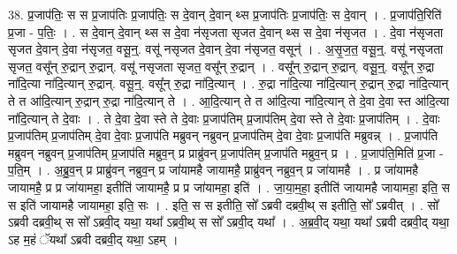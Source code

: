 \documentclass[17pt]{extarticle}
\begin{document}
38. प्र॒जाप॑तिः॒ स स प्र॒जाप॑तिः प्र॒जाप॑तिः॒ स दे॒वान् दे॒वान् थ्स प्र॒जाप॑तिः प्र॒जाप॑तिः॒ स दे॒वान् । . प्र॒जाप॑ति॒रिति॑ प्र॒जा - प॒तिः॒ । . स दे॒वान् दे॒वान् थ्स स दे॒वा न॑सृजता सृजत दे॒वान् थ्स स दे॒वा न॑सृजत । . दे॒वा न॑सृजता सृजत दे॒वान् दे॒वा न॑सृजत॒ वसू॒न्॒. वसू॑ नसृजत दे॒वान् दे॒वा न॑सृजत॒ वसून्॑ । . अ॒सृ॒ज॒त॒ वसू॒न्॒. वसू॑ नसृजता सृजत॒ वसू᳚न् रु॒द्रान् रु॒द्रान्. वसू॑ नसृजता सृजत॒ वसू᳚न् रु॒द्रान् । . वसू᳚न् रु॒द्रान् रु॒द्रान्. वसू॒न्॒. वसू᳚न् रु॒द्रा ना॑दि॒त्या ना॑दि॒त्यान् रु॒द्रान्. वसू॒न्॒. वसू᳚न् रु॒द्रा ना॑दि॒त्यान् । . रु॒द्रा ना॑दि॒त्या ना॑दि॒त्यान् रु॒द्रान् रु॒द्रा ना॑दि॒त्यान् ते त आ॑दि॒त्यान् रु॒द्रान् रु॒द्रा ना॑दि॒त्यान् ते । . आ॒दि॒त्यान् ते त आ॑दि॒त्या ना॑दि॒त्यान् ते दे॒वा दे॒वा स्त आ॑दि॒त्या ना॑दि॒त्यान् ते दे॒वाः । . ते दे॒वा दे॒वा स्ते ते दे॒वाः प्र॒जाप॑तिम् प्र॒जाप॑तिम् दे॒वा स्ते ते दे॒वाः प्र॒जाप॑तिम् । . दे॒वाः प्र॒जाप॑तिम् प्र॒जाप॑तिम् दे॒वा दे॒वाः प्र॒जाप॑ति मब्रुवन् नब्रुवन् प्र॒जाप॑तिम् दे॒वा दे॒वाः प्र॒जाप॑ति मब्रुवन्न् । . प्र॒जाप॑ति मब्रुवन् नब्रुवन् प्र॒जाप॑तिम् प्र॒जाप॑ति मब्रुव॒न् प्र प्राब्रु॑वन् प्र॒जाप॑तिम् प्र॒जाप॑ति मब्रुव॒न् प्र । . प्र॒जाप॑ति॒मिति॑ प्र॒जा - प॒ति॒म् । . अ॒ब्रु॒व॒न् प्र प्राब्रु॑वन् नब्रुव॒न् प्र जा॑यामहै जायामहै॒ प्राब्रु॑वन् नब्रुव॒न् प्र जा॑यामहै । . प्र जा॑यामहै जायामहै॒ प्र प्र जा॑यामहा॒ इतीति॑ जायामहै॒ प्र प्र जा॑यामहा॒ इति॑ । . जा॒या॒म॒हा॒ इतीति॑ जायामहै जायामहा॒ इति॒ स स इति॑ जायामहै जायामहा॒ इति॒ सः । . इति॒ स स इतीति॒ सो᳚ ऽब्रवी दब्रवी॒थ् स इतीति॒ सो᳚ ऽब्रवीत् । . सो᳚ ऽब्रवी दब्रवी॒थ् स सो᳚ ऽब्रवी॒द् यथा॒ यथा᳚ ऽब्रवी॒थ् स सो᳚ ऽब्रवी॒द् यथा᳚ । . अ॒ब्र॒वी॒द् यथा॒ यथा᳚ ऽब्रवी दब्रवी॒द् यथा॒ ऽह म॒हं ॅयथा᳚ ऽब्रवी दब्रवी॒द् यथा॒ ऽहम् । \newline
\pagebreak
{}
\end{document}
